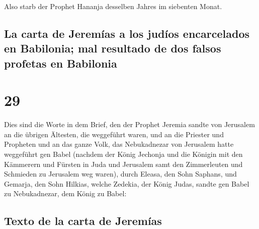 Also starb der Prophet Hananja desselben Jahres im
siebenten Monat.

\hypertarget{la-carta-de-jeremuxedas-a-los-juduxedos-encarcelados-en-babilonia-mal-resultado-de-dos-falsos-profetas-en-babilonia}{%
\subsection{La carta de Jeremías a los judíos encarcelados en Babilonia;
mal resultado de dos falsos profetas en
Babilonia}\label{la-carta-de-jeremuxedas-a-los-juduxedos-encarcelados-en-babilonia-mal-resultado-de-dos-falsos-profetas-en-babilonia}}

\hypertarget{section-28}{%
\section{29}\label{section-28}}

 Dies sind die Worte in dem Brief, den der Prophet Jeremia
sandte von Jerusalem an die übrigen Ältesten, die weggeführt waren, und
an die Priester und Propheten und an das ganze Volk, das Nebukadnezar
von Jerusalem hatte weggeführt gen Babel  (nachdem der
König Jechonja und die Königin mit den Kämmerern und Fürsten in Juda und
Jerusalem samt den Zimmerleuten und Schmieden zu Jerusalem weg waren),
 durch Eleasa, den Sohn Saphans, und Gemarja, den Sohn
Hilkias, welche Zedekia, der König Judas, sandte gen Babel zu
Nebukadnezar, dem König zu Babel:

\hypertarget{texto-de-la-carta-de-jeremuxedas}{%
\subsection{Texto de la carta de
Jeremías}\label{texto-de-la-carta-de-jeremuxedas}}

